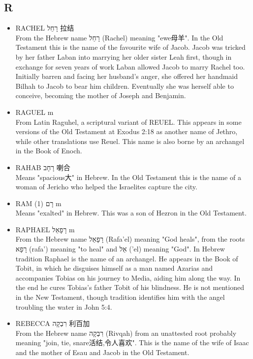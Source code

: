 \subsection{R}
\begin{itemize}
\itemsep-.5em 

\item RACHEL רָחֵל 拉结 \\
From the Hebrew name רָחֵל (Rachel) meaning "ewe母羊". In the Old Testament this is the name of the favourite wife of Jacob. Jacob was tricked by her father Laban into marrying her older sister Leah first, though in exchange for seven years of work Laban allowed Jacob to marry Rachel too. Initially barren and facing her husband's anger, she offered her handmaid Bilhah to Jacob to bear him children. Eventually she was herself able to conceive, becoming the mother of Joseph and Benjamin.
\item RAGUEL m \\
From Latin Raguhel, a scriptural variant of REUEL. This appears in some versions of the Old Testament at Exodus 2:18 as another name of Jethro, while other translations use Reuel. This name is also borne by an archangel in the Book of Enoch.
\item RAHAB רָחָב 喇合 \\
Means "spacious大" in Hebrew. In the Old Testament this is the name of a woman of Jericho who helped the Israelites capture the city.
\item RAM (1) רָם m \\
Means "exalted" in Hebrew. This was a son of Hezron in the Old Testament.
\item RAPHAEL רָפָאֵל m \\
From the Hebrew name רָפָאֵל (Rafa'el) meaning "God heals", from the roots רָפָא (rafa') meaning "to heal" and אֵל ('el) meaning "God". In Hebrew tradition Raphael is the name of an archangel. He appears in the Book of Tobit, in which he disguises himself as a man named Azarias and accompanies Tobias on his journey to Media, aiding him along the way. In the end he cures Tobias's father Tobit of his blindness. He is not mentioned in the New Testament, though tradition identifies him with the angel troubling the water in John 5:4.
\item REBECCA רִבְקָה 利百加 \\
From the Hebrew name רִבְקָה (Rivqah) from an unattested root probably meaning "join, tie, snare活结,令人喜欢". This is the name of the wife of Isaac and the mother of Esau and Jacob in the Old Testament. 


\end{itemize}
